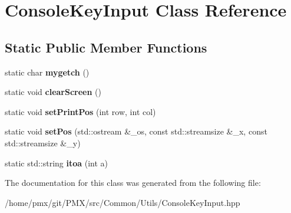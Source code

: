 \hypertarget{classConsoleKeyInput}{}\section{Console\+Key\+Input Class Reference}
\label{classConsoleKeyInput}
\subsection*{Static Public Member Functions}
\begin{DoxyCompactItemize}
\item 
\mbox{\label{classConsoleKeyInput_a60528b5f9b4295de7b271ea4ad16bd96}} 
static char {\bfseries mygetch} ()
\item 
\mbox{\label{classConsoleKeyInput_a6ff58ba8628e71281679d3732553216a}} 
static void {\bfseries clear\+Screen} ()
\item 
\mbox{\label{classConsoleKeyInput_a50c105a501cf1640c7ad5822aba7255f}} 
static void {\bfseries set\+Print\+Pos} (int row, int col)
\item 
\mbox{\label{classConsoleKeyInput_a8278d7c0c84e2096dfddc9fcb8193837}} 
static void {\bfseries set\+Pos} (std\+::ostream \&\+\_\+os, const std\+::streamsize \&\+\_\+x, const std\+::streamsize \&\+\_\+y)
\item 
\mbox{\label{classConsoleKeyInput_a16fa8ce68d9c99d5f26f2b1d6c11a5b0}} 
static std\+::string {\bfseries itoa} (int a)
\end{DoxyCompactItemize}


The documentation for this class was generated from the following file\+:\begin{DoxyCompactItemize}
\item 
/home/pmx/git/\+P\+M\+X/src/\+Common/\+Utils/Console\+Key\+Input.\+hpp\end{DoxyCompactItemize}
